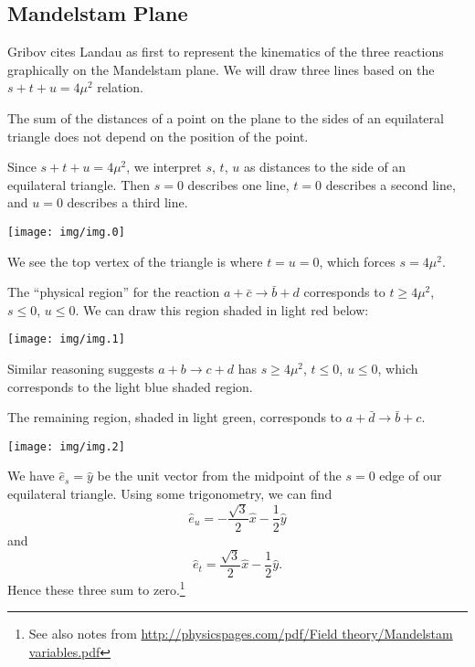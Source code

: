 \subsection{Mandelstam Plane}

\M
Gribov cites Landau as first to represent the kinematics of the three
reactions graphically on the Mandelstam plane. We will draw three lines
based on the $s+t+u=4\mu^{2}$ relation.

The sum of the distances of a point on the plane to the sides of an
equilateral triangle does not depend on the position of the point.

\M[1]
Since $s+t+u=4\mu^{2}$, we interpret $s$, $t$, $u$ as distances to the
side of an equilateral triangle. Then $s=0$ describes one line, $t=0$
describes a second line, and $u=0$ describes a third line.

\begin{center}
  \texttt{[image: img/img.0]}
\end{center}


We see the top vertex of the triangle is where $t=u=0$, which forces
$s=4\mu^{2}$.

\M
The ``physical region'' for the reaction $a+\bar{c}\to\bar{b}+d$
corresponds to $t\geq4\mu^{2}$, $s\leq0$, $u\leq0$. We can draw this
region shaded in light red below:

\begin{center}
  \texttt{[image: img/img.1]}
\end{center}

Similar reasoning suggests $a+b\to c+d$ has $s\geq4\mu^{2}$, $t\leq0$,
$u\leq0$, which corresponds to the light blue shaded region.

The remaining region, shaded in light green, corresponds to
$a+\bar{d}\to\bar{b}+c$.

\begin{center}
  \texttt{[image: img/img.2]}
\end{center}

\M
We have $\widehat{e}_{s}=\widehat{y}$ be the unit vector from the
midpoint of the $s=0$ edge of our equilateral triangle. Using some
trigonometry, we can find
\begin{equation}
\widehat{e}_{u} = -\frac{\sqrt{3}}{2}\widehat{x} - \frac{1}{2}\widehat{y}
\end{equation}
and
\begin{equation}
\widehat{e}_{t} = \frac{\sqrt{3}}{2}\widehat{x} - \frac{1}{2}\widehat{y}.
\end{equation}
Hence these three sum to zero.\footnote{See also notes from
\url{http://physicspages.com/pdf/Field theory/Mandelstam variables.pdf}}


